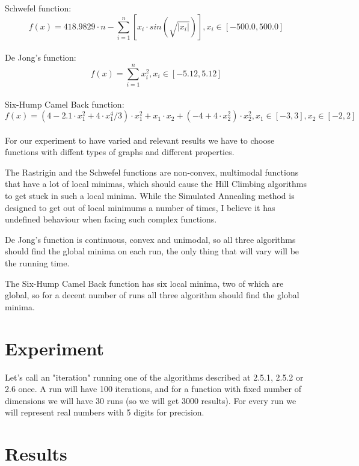 \documentclass[a4paper]{article}
\begin{document}
Schwefel function:
$$ f(x) = 418.9829\cdot n - \sum_{i=1}^n \left[ x_i \cdot sin(\sqrt{|x_i|}) \right], x_i \in \left[ -500.0, 500.0\right]$$
\\

De Jong's function:
$$ f(x) = \sum_{i=1}^{n} x_i^2, x_i \in \left[ -5.12, 5.12 \right]$$
\\

Six-Hump Camel Back function:
$$ f(x)=(4 - 2.1 \cdot x_1^2 + 4 \cdot x_1^4 / 3) \cdot x_1^2 +  x_1 \cdot x_2 + (-4 + 4 \cdot x_2^2) \cdot x_2^2, x_1 \in \left[ -3, 3 \right], x_2 \in \left[ -2, 2 \right] $$
\\

For our experiment to have varied and relevant results we have to choose functions with diffent types of graphs and different properties.

The Rastrigin and the Schwefel functions are non-convex, multimodal functions that have a lot of local minimas, which should cause the Hill Climbing algorithms to get stuck in such a local minima. While the Simulated Annealing method is designed to get out of local minimums a number of times, I believe it has undefined behaviour when facing such complex functions.

De Jong's function is continuous, convex and unimodal, so all three algorithms should find the global minima on each run, the only thing that will vary will be the running time.

The Six-Hump Camel Back function has six local minima, two of which are global, so for a decent number of runs all three algorithm should find the global minima.

\section{Experiment}

Let's call an "iteration" running one of the algorithms described at 2.5.1, 2.5.2 or 2.6 once. A run will have 100 iterations, and for a function with fixed number of dimensions we will have 30 runs (so we will get 3000 results). For every run we will represent real numbers with 5 digits for precision.

\clearpage

\section{Results}
\end{document}
